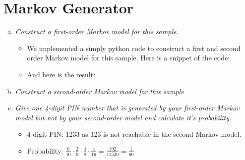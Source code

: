 
\graphicspath{ {./src/} } 
\usepackage{hyperref}

\newcommand{\dozent}{Volker Roth}
\newcommand{\tutor}{Oliver Wiese}
\newcommand{\tutoriumNo}{02\\Materialien: Latex, VSC, Skript}
\newcommand{\ubungNo}{03}
\newcommand{\veranstaltung}{Rechnersicherheit}
\newcommand{\semester}{SoSe 21}




\section{Markov Generator}
\begin{enumerate}[(a)]
    \item {\itshape Construct a first-order Markov model for this sample.}
    \begin{itemize}
        \item We implemented a simply python code to construct a first and second order Markov model for this sample. Here is a snippet of the code:
        
        \item And here is the result:
        
    \end{itemize}
    \item {\itshape Construct a second-order Markov model for this sample}
   \begin{itemize}
       
   \end{itemize}

    \item {\itshape Give one 4-digit PIN number that is generated by your first-order Markov model but not by your second-order model and calculate it’s probability.}
    \begin{itemize}
        \item 4-digit PIN: 1233 as 123 is not reachable in the second Markov model.
        \item Probability:  $\frac{6}{10} \cdot \frac{2}{9} \cdot \frac{4}{8} \cdot \frac{4}{16} = \frac{192}{11520} = \frac{1}{60} $
    \end{itemize}
   
    
\end{enumerate}

